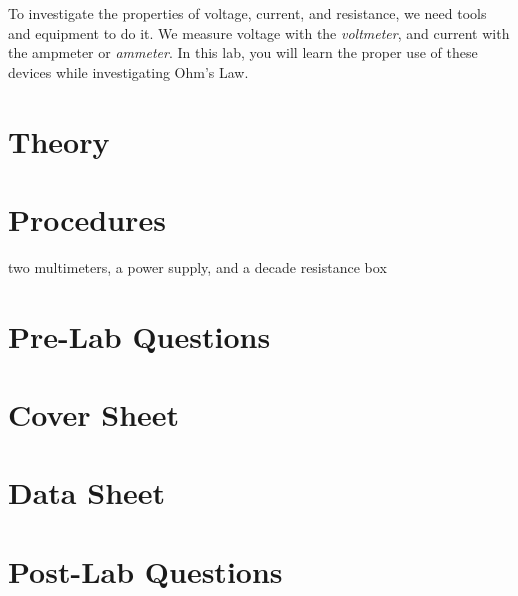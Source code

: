 \documentclass[12pt]{article}
\begin{document}
To investigate the properties of voltage, current, and resistance, we
need tools and equipment to do it.  We measure voltage with the
\textit{voltmeter}, and current with the ampmeter or
\textit{ammeter}.  In this lab, you will learn the proper use of these
devices while investigating Ohm's Law.

\section{Theory}
\label{sec:theory}

\section{Procedures}
\label{sec:procedures}

two multimeters, a power supply, and a decade resistance box

\section{Pre-Lab Questions}
\label{sec:prelab}

\section{Cover Sheet}
\label{sec:coversheet}

\section{Data Sheet}
\label{sec:datasheet}

\section{Post-Lab Questions}
\label{sec:postlab}
\end{document}
